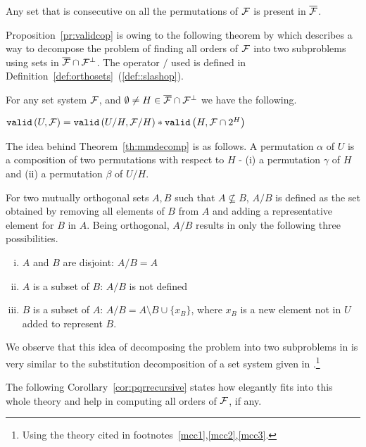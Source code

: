 \begin{proposition}
  \label{pr:validcop}
  Any set that is consecutive on all the \COP permutations of ${\cal F}$ is
  present in $\overline{{\cal F}}$.
\end{proposition}

Proposition~\ref{pr:validcop} is owing to the following theorem by
which \cite{mm96} describes a way to decompose the problem of finding
all \COP orders of ${\cal F}$ into two subproblems using sets in
$\overline{{\cal F}} \cap {\cal F}^{\bot}$. The operator $/$ used is defined in
Definition~\ref{def:orthosets}~(\ref{def::slashop}).

\begin{theoremsansproof}[{\cite[Th.~7]{mm96}}]
  \label{th:mmdecomp}
  For any set system ${\cal F}$, and $\emptyset \ne H \in \overline{{\cal F}}
  \cap {\cal F}^{\bot}$ we have the following.\par
  \centering
  ${\tt valid}\left(U,{\cal F}\right) = {\tt valid}\left(U/H,{\cal F}/H\right) * {\tt valid}\left(H,{\cal F} \cap 2^H\right)$
\end{theoremsansproof}


\def \ff {\overline{\cF} \cap \cF^{\bot}}
The idea behind Theorem~\ref{th:mmdecomp} is as follows. A permutation $\alpha$
of $U$ is a composition of two permutations with respect to $H$ - (i) a
permutation $\gamma$ of $H$ and (ii) a permutation $\beta$ of $U / H$.

For two mutually orthogonal sets $A, B$ such that $A \nsubseteq B$,
$A/B$ is defined as the set obtained by removing all elements of $B$
from $A$ and adding a representative element for $B$ in $A$. Being orthogonal,
$A/B$ results in only the following three possibilities.
\begin{enumerate}[i. ]
\item $A$ and $ B$ are disjoint: $A/B  = A$
\item $A$ is a subset of $B$: $A/B$ is not defined
\item $B$ is a subset of $A$: $A/B = A \setminus B \cup \{x_B\}$, where $x_B$
is a new element not in $U$ added to represent $B$.
\end{enumerate}

We observe that this idea of decomposing the \COP problem into two
subproblems in \cite{mm96} is very similar to the substitution
decomposition of a set system given in \cite[Sec.~4]{mcc04}.\footnote{Using
  the theory cited in footnotes~\ref{mcc1},\ref{mcc2},\ref{mcc3}.}

The following Corollary~\ref{cor:pqrrecursive} states how
\PQRtree elegantly fits into this whole theory and help in computing
all \COP orders of ${\cal F}$, if any.

